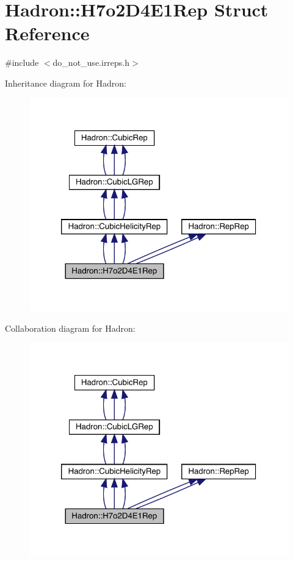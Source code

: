 \hypertarget{structHadron_1_1H7o2D4E1Rep}{}\section{Hadron\+:\+:H7o2\+D4\+E1\+Rep Struct Reference}
\label{structHadron_1_1H7o2D4E1Rep}


{\ttfamily \#include $<$do\+\_\+not\+\_\+use.\+irreps.\+h$>$}



Inheritance diagram for Hadron\+:
\nopagebreak
\begin{figure}[H]
\begin{center}
\leavevmode
\includegraphics[width=320pt]{dc/d28/structHadron_1_1H7o2D4E1Rep__inherit__graph}
\end{center}
\end{figure}


Collaboration diagram for Hadron\+:
\nopagebreak
\begin{figure}[H]
\begin{center}
\leavevmode
\includegraphics[width=320pt]{d7/d23/structHadron_1_1H7o2D4E1Rep__coll__graph}
\end{center}
\end{figure}
